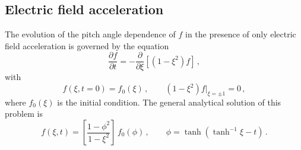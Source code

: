 \documentclass[preprint,11pt]{elsarticle}
\newcommand{\bq}{\begin{equation}}
\newcommand{\eq}{\end{equation}}
\begin{document}
\subsection{Electric field acceleration}\label{SubSect:Pitch-1}
The evolution of the pitch angle dependence of $f$ in the presence of only electric field acceleration is governed by the equation
\bq
\label{pitch_E_eq}
\frac{\partial f}{\partial t}= - \frac{\partial}{\partial\xi} \left[ \left(1-\xi^2\right) f \right] \, ,
\eq
with
\bq
\label{ic_bc}
f(\xi, t=0)=f_0(\xi)\, , \qquad (1-\xi^2)f|_{\xi=\pm 1}=0 \, ,
\eq
where $f_0(\xi)$ is the initial condition. 
The general analytical solution of this problem is
\bq
\label{pitch_E_sol}
f(\xi,t)=\left[ \frac{1-\phi^2}{1-\xi^2}\right]\, f_0(\phi)\, , \qquad \phi=\tanh \left( \tanh^{-1} \xi -t \right) \, .
\eq

\end{document}
